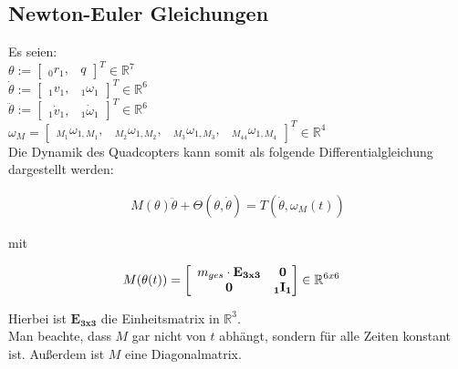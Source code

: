 \documentclass[12pt, a4paper]{scrartcl}
\newcommand{\R}{\mathbb{R}}
\begin{document}
\subsection{Newton-Euler Gleichungen}

Es seien: \\
$ \theta := \left[ \begin{matrix} {_{0}} r_{1}, & q \end{matrix} \right]^T \in \R^{7} $ \\
$ \dot \theta := \left[ \begin{matrix} {_{1}} v_{1},&{_{1}} \omega_{1} \end{matrix}\right]^T \in \R^6 $ \\
$ \ddot \theta := \left[ \begin{matrix} {_{1}}\dot v_{1},&{_{1}}\dot \omega_{1} \end{matrix} \right]^T \in \R^6 $ \\
$ \omega_{M} = \left[\begin{matrix} _{M_1}\omega_{1,M_1}, & _{M_2}\omega_{1,M_2}, & _{M_3}\omega_{1,M_3}, & _{M_44}\omega_{1,M_4} \end{matrix}\right]^T \in \R^4$ \\

Die Dynamik des Quadcopters kann somit als folgende Differentialgleichung dargestellt werden:

\begin{align*}
  M(\theta) \ddot\theta + \Theta (\theta, \dot \theta) = T(\dot \theta, \omega_M(t))
\end{align*}

mit 

\begin{align*}
	M(\theta(t)) &= 
		\left[ 
				\begin{array}{c@{}c@{}}
						m_{ges} \cdot \mathbf{E_{3x3}}  & \quad \mathbf{0} \\
						\mathbf{0} & \quad \mathbf{{_{1}I_{1}}} \\
				\end{array}
		\right] \in \R^{6x6}
\end{align*}

Hierbei ist $ \mathbf{E_{3x3}} $ die Einheitsmatrix in $ \R^3 $. \\
Man beachte, dass $ M $ gar nicht von $ t $ abhängt, sondern für alle Zeiten konstant ist. Außerdem ist $ M $ eine Diagonalmatrix.
	
\end{document}
